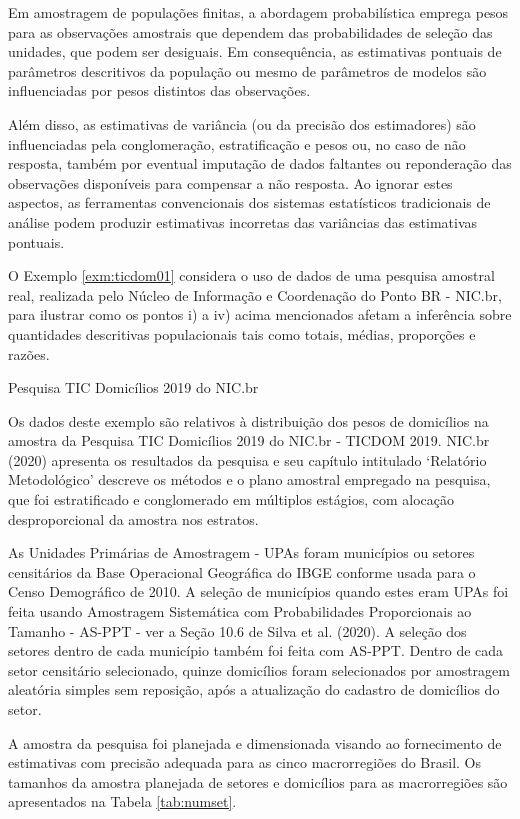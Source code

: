 \documentclass[
  12pt,
  brazilian,
]{book}
\theoremstyle{definition}
\theoremstyle{definition}
\theoremstyle{definition}
\theoremstyle{definition}
\theoremstyle{remark}
\begin{document}
Em amostragem de populações finitas, a abordagem probabilística emprega pesos para as observações amostrais que dependem das probabilidades de seleção das unidades, que podem ser desiguais. Em consequência, as estimativas pontuais de parâmetros descritivos da população ou mesmo de parâmetros de modelos são influenciadas por pesos distintos das observações.

Além disso, as estimativas de variância (ou da precisão dos estimadores) são influenciadas pela conglomeração, estratificação e pesos ou, no caso de não resposta, também por eventual imputação de dados faltantes ou reponderação das observações disponíveis para compensar a não resposta. Ao ignorar estes aspectos, as ferramentas convencionais dos sistemas estatísticos tradicionais de análise podem produzir estimativas incorretas das variâncias das estimativas pontuais.

O Exemplo \ref{exm:ticdom01} considera o uso de dados de uma pesquisa amostral real, realizada pelo Núcleo de Informação e Coordenação do Ponto BR - NIC.br, para ilustrar como os pontos i) a iv) acima mencionados afetam a inferência sobre quantidades descritivas populacionais tais como
totais, médias, proporções e razões.

\textbf{\label{exm:ticdom01}} Pesquisa TIC Domicílios 2019 do NIC.br

Os dados deste exemplo são relativos à distribuição dos pesos de domicílios na amostra da Pesquisa TIC Domicílios 2019 do NIC.br - TICDOM 2019. NIC.br (2020) apresenta os resultados da pesquisa e seu capítulo intitulado `Relatório Metodológico' descreve os métodos e o plano amostral empregado na pesquisa, que foi estratificado e conglomerado em múltiplos estágios, com alocação desproporcional da amostra nos estratos.

As Unidades Primárias de Amostragem - UPAs foram municípios ou setores censitários da Base Operacional Geográfica do IBGE conforme usada para o Censo Demográfico de 2010. A seleção de municípios quando estes eram UPAs foi feita usando Amostragem Sistemática com Probabilidades Proporcionais ao Tamanho - AS-PPT - ver a Seção 10.6 de Silva et al. (2020). A seleção dos setores dentro de cada município também foi feita com AS-PPT. Dentro de cada setor censitário selecionado, quinze domicílios foram selecionados por amostragem aleatória simples sem reposição, após a atualização do cadastro de domicílios do setor.

A amostra da pesquisa foi planejada e dimensionada visando ao fornecimento de estimativas com precisão adequada para as cinco macrorregiões do Brasil. Os tamanhos da amostra planejada de setores e domicílios para as macrorregiões são apresentados na Tabela \ref{tab:numset}.
\end{document}
